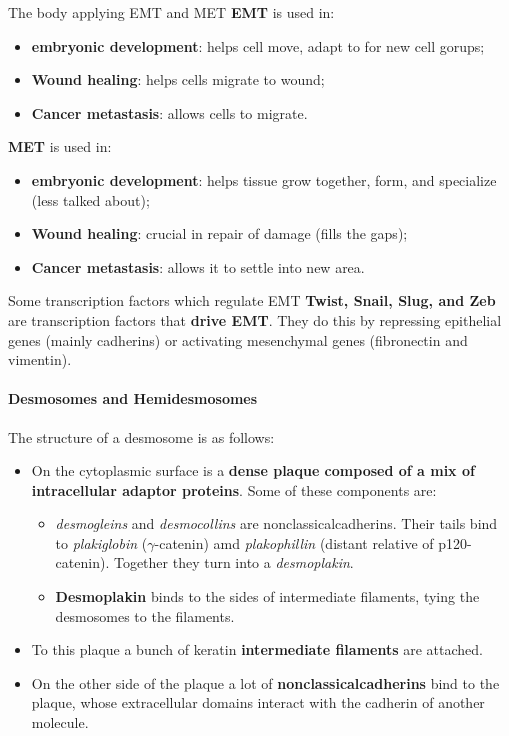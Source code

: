 \documentclass[../main.tex]{subfiles}
\begin{document}
\begin{RemarkWithTitel}{The body applying EMT and MET}
	\textbf{EMT} is used in:
	\begin{itemize}
		\item \textbf{embryonic development}: helps cell move, adapt to for new cell gorups;
		\item \textbf{Wound healing}: helps cells migrate to wound;
		\item \textbf{Cancer metastasis}: allows cells to migrate.
	\end{itemize}
	\textbf{MET} is used in:
	\begin{itemize}
		\item \textbf{embryonic development}: helps tissue grow together, form, and specialize (less talked about);
		\item \textbf{Wound healing}: crucial in repair of damage (fills the gaps);
		\item \textbf{Cancer metastasis}: allows it to settle into new area.
	\end{itemize}
\end{RemarkWithTitel}

\begin{RemarkWithTitel}{Some transcription factors which regulate EMT}
	\textbf{\gls{Twist}, \gls{Snail}, \gls{Slug}, and \gls{Zeb}} are transcription factors that \textbf{drive EMT}. They do this by repressing epithelial genes (mainly cadherins) or activating mesenchymal genes (\gls{fibronectin} and \gls{vimentin}).
\end{RemarkWithTitel}

\paragraph{Desmosomes and Hemidesmosomes}
\label{sec:demso}

The structure of a desmosome is as follows:
\begin{itemize}
	\item On the cytoplasmic surface is a \textbf{dense plaque composed of a mix of intracellular adaptor proteins}. Some of these components are:
	\begin{itemize}
		\item \textit{\gls{desmogleins}} and \textit{\gls{desmocollins}} are \gls{nonclassicalcadherins}. Their tails bind to \textit{\gls{plakiglobin}} ($\gamma$-catenin) amd \textit{plakophillin} (distant relative of p120-catenin). Together they turn into a \textit{desmoplakin}.
		\item \textbf{Desmoplakin} binds to the sides of intermediate filaments, tying the \gls{desmosomes} to the filaments.
	\end{itemize}
	\item To this plaque a bunch of keratin \textbf{intermediate filaments} are attached.
	\item On the other side of the plaque a lot of \textbf{\gls{nonclassicalcadherins}} bind to the plaque, whose extracellular domains interact with the \gls{cadherin} of another molecule.
\end{itemize}
\end{document}
